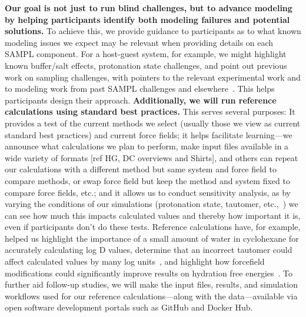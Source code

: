 \documentclass[11pt]{article}
\begin{document}
\textbf{Our goal is not just to run blind challenges, but to advance modeling by helping participants identify both modeling failures and potential solutions.} 
To achieve this, we provide guidance to participants as to what known modeling issues we expect may be relevant when providing details on each SAMPL component.
For a host-guest system, for example, we might highlight known buffer/salt effects, protonation state challenges, and point out previous work on sampling challenges, with pointers to the relevant experimental work and to modeling work from past SAMPL challenges and elsewhere~\cite{mobley_predicting_2016}.
This helps participants design their approach.
{\bf Additionally, we will run reference calculations using standard best practices.} 
This serves several purposes:
It provides a test of the current methods we select (usually those we view as current standard best practices) and current force fields; 
it helps facilitate learning---we announce what calculations we plan to perform, make input files available in a wide variety of formats [ref HG, DC overviews and Shirts], and others can repeat our calculations with a different method but same system and force field to compare methods, or swap force field but keep the method and system fixed to compare force fields, etc.; 
and it allows us to conduct sensitivity analysis, as by varying the conditions of our simulations (protonation state, tautomer, etc.,~\cite{bannan_blind_2016}) we can see how much this impacts calculated values and thereby how important it is, even if participants don't do these tests.
Reference calculations have, for example, helped us highlight the importance of a small amount of water in cyclohexane for accurately calculating log D values, determine that an incorrect tautomer could affect calculated values by many log units~\cite{bannan_blind_2016}, and highlight how forcefield modifications could significantly improve results on hydration free energies~\cite{mobley_blind_2014-1}.
To further aid follow-up studies, we will make the input files, results, and simulation workflows used for our reference calculations---along with the data---available via open software development portals such as GitHub and Docker Hub.
\end{document}
